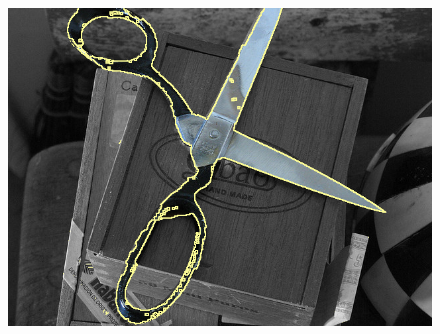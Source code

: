 \documentclass{siamart220329}
\begin{document}
\begin{figure}[h!]
{\includegraphics[scale=0.12]{figures/coco-experiment/completion/scissors/gc-seg.png}
}%


\end{figure}
\end{document}
